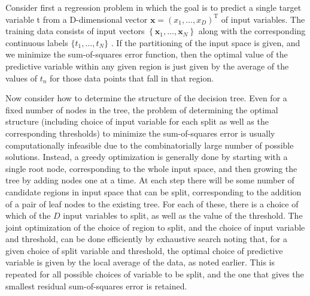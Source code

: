 \documentclass[
  10
]{article}
\begin{document}
Consider first a regression problem in which the goal is to predict a
single target variable t from a D-dimensional vector
\(\mathbf x = ( x _ { 1 } , \hdots , x _ { D } ) ^ { \mathrm T }\) of
input variables. The training data consists of input vectors
\(\left\{ \mathbf { x } _ { 1 } , \ldots , \mathbf { x } _ { N } \right\}\)
along with the corresponding continuous labels
\(\{ t _ { 1 } , \ldots , t _ { N } \}\) . If the partitioning of the
input space is given, and we minimize the sum-of-squares error function,
then the optimal value of the predictive variable within any given
region is just given by the average of the values of \(t _ { n }\) for
those data points that fall in that region.

Now consider how to determine the structure of the decision tree. Even
for a fixed number of nodes in the tree, the problem of determining the
optimal structure (including choice of input variable for each split as
well as the corresponding thresholds) to minimize the sum-of-squares
error is usually computationally infeasible due to the combinatorially
large number of possible solutions. Instead, a greedy optimization is
generally done by starting with a single root node, corresponding to the
whole input space, and then growing the tree by adding nodes one at a
time. At each step there will be some number of candidate regions in
input space that can be split, corresponding to the addition of a pair
of leaf nodes to the existing tree. For each of these, there is a choice
of which of the \(D\) input variables to split, as well as the value of
the threshold. The joint optimization of the choice of region to split,
and the choice of input variable and threshold, can be done efficiently
by exhaustive search noting that, for a given choice of split variable
and threshold, the optimal choice of predictive variable is given by the
local average of the data, as noted earlier. This is repeated for all
possible choices of variable to be split, and the one that gives the
smallest residual sum-of-squares error is retained.
\end{document}
